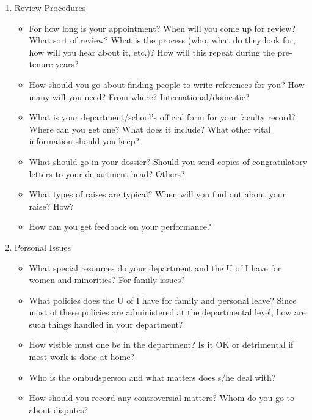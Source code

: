 \begin{enumerate}
\begin{enumerate}
\begin{itemize}\item
	How much time should you spend advising academic counselees?
\item
	How much committee work should you expect? Which committees should you turn 
down if asked to serve? How much time should you expect to spend on committee 
work?  Department vs. University of Illinois  versus outside?
\item
	What types of outside service should you do while untenured? Paper and proposal 
reviewing?  Review boards? Journal assistant editorships?
\end{itemize}

\item
Review Procedures


\begin{itemize}\item
	For how long is your appointment? When will you come up for review? What sort 
of review?  What is the process (who, what do they look for, how will you hear 
about it, etc.)? How will this repeat during the pre-tenure years?
\item
	How should you go about finding people to write references for you? How many 
will you need?  From where? International/domestic?
\item
	What is your department/school's official form for your faculty record? Where 
can you get one?  What does it include? What other vital information should you 
keep?
\item
	What should go in your dossier? Should you send copies of congratulatory letters 
to your department head? Others?
\item
	What types of raises are typical? When will you find out about your raise? How?
\item
	How can you get feedback on your performance?

\end{itemize}
\item
 Personal Issues


\begin{itemize}\item
	What special resources do your department and the U of I
 have for women and 
minorities? For family issues?
\item
	What policies does the U of I have for family and personal leave? Since most of 
these policies are administered at the departmental level, how are such things 
handled in your department?
\item
	How visible must one be in the department? Is it OK or detrimental if most work is 
done at home?
\item
	Who is the ombudsperson and what matters does s/he deal with?
\item
	How should you record any controversial matters? Whom do you go to about 
disputes?
\end{itemize}

\end{enumerate}
\end{enumerate}


